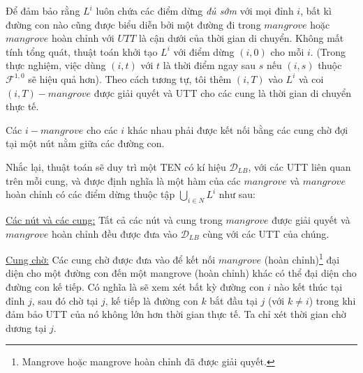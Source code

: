 \documentclass[../main.tex]{subfiles}
\begin{document}
Để đảm bảo rằng \(L^i\) luôn chứa các điểm dừng \emph{đủ sớm} với mọi
đỉnh \(i\), bất kì đường con nào cũng được biểu diễn bởi một đường đi
trong \(mangrove\) hoặc \(mangrove\) hoàn chỉnh với \(UTT\) là cận dưới
của thời gian di chuyển. Không mất tính tổng quát, thuật toán khởi tạo
\(L^i\) với điểm dừng \((i, 0)\) cho mỗi \(i\). (Trong thực nghiệm, việc
dùng \((i, t)\) với \(t\) là thời điểm ngay sau \(s\) nếu \((i, s)\)
thuộc \(\mathcal F^{1,0}\) sẽ hiệu quả hơn). Theo cách tương tự, tôi thêm
\((i, T)\) vào \(L^i\) và coi \((i, T)-mangrove\) được giải quyết và UTT
cho các cung là thời gian di chuyển thực tế.

Các \(i-mangrove\) cho các \(i\) khác nhau phải được kết nối bằng các
cung chờ đợi tại một nút nằm giữa các đường con.

Nhắc lại, thuật toán sẽ duy trì một TEN có kí hiệu \(\mathcal D_{LB}\),
với các UTT liên quan trên mỗi cung, và được định nghĩa là một hàm của
các \(mangrove\) và \(mangrove\) hoàn chỉnh có các điểm dừng thuộc tập
\(\bigcup _{i\in N} L^i\) như sau:

\underline{Các nút và các cung:} Tất cả các nút và cung trong \(mangrove\) được giải
quyết và \(mangrove\) hoàn chỉnh đều được đưa vào \(\mathcal D_{LB}\)
cùng với các UTT của chúng.

\underline{Cung chờ:} Các cung chờ được đưa vào để kết nối \(mangrove\) (hoàn
chỉnh)\footnote{Mangrove hoặc mangrove hoàn chỉnh đã được giải quyết.}
đại diện cho một đường con đến một mangrove (hoàn chỉnh) khác có thể đại
diện cho đường con kế tiếp. Có nghĩa là sẽ xem xét bất kỳ đường con
\(i\) nào kết thúc tại đỉnh \(j\), sau đó chờ tại \(j\), kế tiếp là
đường con \(k\) bắt đầu tại \(j\) (với \(k\neq i\)) trong khi đảm bảo
UTT của nó không lớn hơn thời gian thực tế. Ta chỉ xét thời gian chờ
dương tại \(j\).
\end{document}
